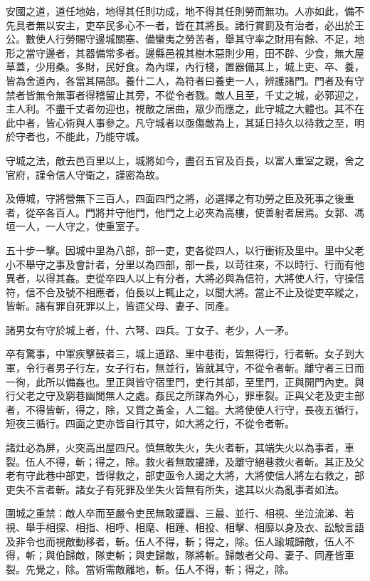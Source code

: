
\begin{pinyinscope}
安國之道，道任地始，地得其任則功成，地不得其任則勞而無功。人亦如此，備不先具者無以安主，吏卒民多心不一者，皆在其將長。諸行賞罰及有治者，必出於王公。數使人行勞賜守邊城關塞、備蠻夷之勞苦者，舉其守率之財用有餘、不足，地形之當守邊者，其器備常多者。邊縣邑視其樹木惡則少用，田不辟、少食，無大屋草蓋，少用桑。多財，民好食。為內堞，內行棧，置器備其上，城上吏、卒、養，皆為舍道內，各當其隔部。養什二人，為符者曰養吏一人，辨護諸門。門者及有守禁者皆無令無事者得稽留止其旁，不從令者戮。敵人且至，千丈之城，必郭迎之，主人利。不盡千丈者勿迎也，視敵之居曲，眾少而應之，此守城之大體也。其不在此中者，皆心術與人事參之。凡守城者以亟傷敵為上，其延日持久以待救之至，明於守者也，不能此，乃能守城。

守城之法，敵去邑百里以上，城將如今，盡召五官及百長，以富人重室之親，舍之官府，謹令信人守衛之，謹密為故。

及傅城，守將營無下三百人，四面四門之將，必選擇之有功勞之臣及死事之後重者，從卒各百人。門將并守他門，他門之上必夾為高樓，使善射者居焉。女郭、馮垣一人，一人守之，使重室子。

五十步一擊。因城中里為八部，部一吏，吏各從四人，以行衝術及里中。里中父老小不舉守之事及會計者，分里以為四部，部一長，以苛往來，不以時行、行而有他異者，以得其姦。吏從卒四人以上有分者，大將必與為信符，大將使人行，守操信符，信不合及號不相應者，伯長以上輒止之，以聞大將。當止不止及從吏卒縱之，皆斬。諸有罪自死罪以上，皆遝父母、妻子、同產。

諸男女有守於城上者，什、六弩、四兵。丁女子、老少，人一矛。

卒有驚事，中軍疾擊鼓者三，城上道路、里中巷街，皆無得行，行者斬。女子到大軍，令行者男子行左，女子行右，無並行，皆就其守，不從令者斬。離守者三日而一徇，此所以備姦也。里正與皆守宿里門，吏行其部，至里門，正與開門內吏。與行父老之守及窮巷幽閒無人之處。姦民之所謀為外心，罪車裂。正與父老及吏主部者，不得皆斬，得之，除，又賞之黃金，人二鎰。大將使使人行守，長夜五循行，短夜三循行。四面之吏亦皆自行其守，如大將之行，不從令者斬。

諸灶必為屏，火突高出屋四尺。慎無敢失火，失火者斬，其端失火以為事者，車裂。伍人不得，斬；得之，除。救火者無敢讙譁，及離守絕巷救火者斬。其正及父老有守此巷中部吏，皆得救之，部吏亟令人謁之大將，大將使信人將左右救之，部吏失不言者斬。諸女子有死罪及坐失火皆無有所失，逮其以火為亂事者如法。

圍城之重禁：敵人卒而至嚴令吏民無敢讙囂、三最、並行、相視、坐泣流涕、若視、舉手相探、相指、相呼、相麾、相踵、相投、相擊、相靡以身及衣、訟駮言語及非令也而視敵動移者，斬。伍人不得，斬；得之，除。伍人踰城歸敵，伍人不得，斬；與伯歸敵，隊吏斬；與吏歸敵，隊將斬。歸敵者父母、妻子、同產皆車裂。先覺之，除。當術需敵離地，斬。伍人不得，斬；得之，除。


\end{pinyinscope}
